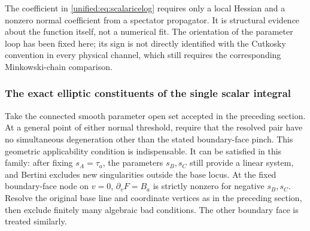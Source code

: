 \documentclass[11pt,a4paper,oneside]{article}
\theoremstyle{plain}
\theoremstyle{definition}
\theoremstyle{remark}
\numberwithin{equation}{section}
\begin{document}
The coefficient in \eqref{unified:eq:scalaricelog} requires only a local Hessian and a nonzero normal coefficient
from a spectator propagator. It is structural evidence about the function itself, not a numerical fit.
The orientation of the parameter loop has been fixed here; its sign is not directly identified with the Cutkosky convention
in every physical channel, which still requires the corresponding Minkowski-chain comparison.

\subsubsection{The exact elliptic constituents of the single scalar integral}
Take the connected smooth parameter open set accepted in the preceding section. At a general point of either normal threshold,
require that the resolved pair have no simultaneous degeneration other than the stated boundary-face pinch.
This geometric applicability condition is indispensable.
It can be satisfied in this family: after fixing $s_A=\tau_a$,
the parameters $s_B,s_C$ still provide a linear system, and Bertini excludes new singularities outside the base locus.
At the fixed boundary-face node on $v=0$,
$\partial_vF=B_a$ is strictly nonzero for negative $s_B,s_C$.
Resolve the original base line and coordinate vertices as in the preceding section,
then exclude finitely many algebraic bad conditions. The other boundary face is treated similarly.
\end{document}
